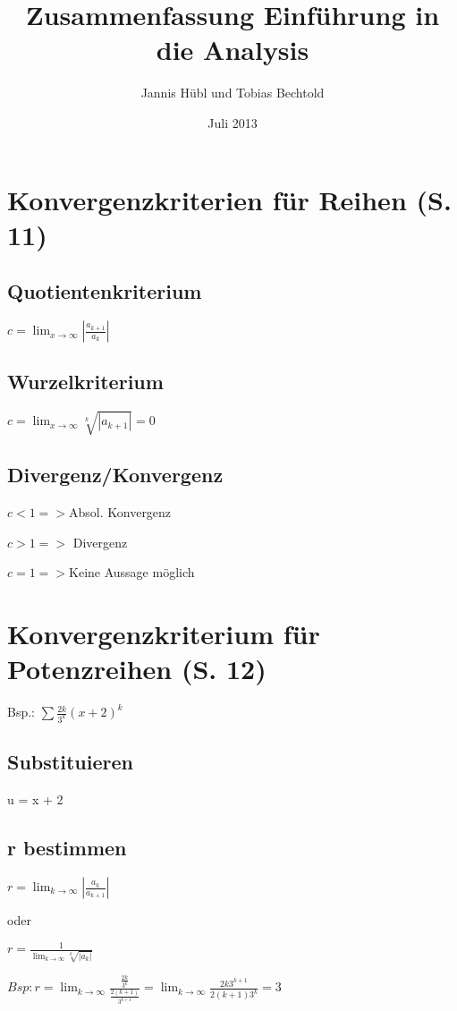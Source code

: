 \documentclass[a4paper, 11pt]{article}
\title{Zusammenfassung Einführung in die Analysis}
\author{Jannis Hübl und Tobias Bechtold}
\date{Juli 2013}
\begin{document}
\maketitle
\newpage
\tableofcontents
\newpage
\section{Konvergenzkriterien für Reihen (S. 11)}

\subsection{Quotientenkriterium}


$ c = \lim_{x \to \infty} |\frac {a_{k+1}} {a_{k}}|$


\subsection{Wurzelkriterium}

$ c = \lim_{x \to \infty} \sqrt[k]{|a_{k+1}|} = 0 $

\subsection{Divergenz/Konvergenz}

$ c < 1 => $Absol. Konvergenz

$ c > 1 => $ Divergenz

$ c = 1 => $Keine Aussage möglich

\section{Konvergenzkriterium für Potenzreihen (S. 12)}

Bsp.: $ \sum \frac{2k}{3^k} (x + 2)^k$

\subsection {Substituieren}
u = x + 2

\subsection {r bestimmen}

$ r = \lim_{k \to \infty} |\frac{a_k}{a_{k+1}}| $

oder

$ r = \frac {1} {\lim_{k \to \infty} \sqrt[k]{|a_k|}}$

$Bsp: r = \lim_{k \to
\infty} \frac {\frac {2k} {3^k}}{\frac{2(k+1)}{3^{k+1}}} = \lim_{k \to \infty}
\frac {2k 3^{k+1}}{2(k+1) 3^k} = 3$
\end{document}
